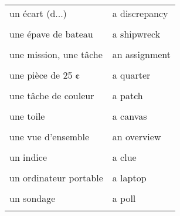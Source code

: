 \documentclass[
  10pt,
]{article}
\begin{document}
\begin{longtable}{ll}
un écart (d...) & a discrepancy\\

\cellcolor{gray!6}{un écart (g...)} & \cellcolor{gray!6}{a gap}\\

une épave de bateau & a shipwreck\\

\cellcolor{gray!6}{une légende d'image} & \cellcolor{gray!6}{a caption}\\

une mission, une tâche & an assignment\\

\cellcolor{gray!6}{une pièce de 10 ¢} & \cellcolor{gray!6}{a dime}\\

une pièce de 25 ¢ & a quarter\\

\cellcolor{gray!6}{une pièce de 5 ¢} & \cellcolor{gray!6}{a nickel}\\

une tâche de couleur & a patch\\

\cellcolor{gray!6}{une tempête} & \cellcolor{gray!6}{a storm}\\

une toile & a canvas\\

\cellcolor{gray!6}{une vague} & \cellcolor{gray!6}{a wave}\\

une vue d'ensemble & an overview\\

\cellcolor{gray!6}{un hommage} & \cellcolor{gray!6}{a tribute}\\

un indice & a clue\\

\cellcolor{gray!6}{un ordinateur de bureau} & \cellcolor{gray!6}{a desktop}\\

un ordinateur portable & a laptop\\

\cellcolor{gray!6}{un rédacteur en chef} & \cellcolor{gray!6}{an editor}\\

un sondage & a poll\\

\cellcolor{gray!6}{un stage} & \cellcolor{gray!6}{an internship}\\


\end{longtable}
\end{document}
